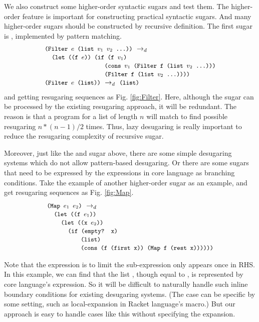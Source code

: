 We also construct some higher-order syntactic sugars and test them. The higher-order feature is important for constructing practical syntactic sugars. And many higher-order sugars should be constructed by recursive definition. The first sugar is , implemented by pattern matching.
\[\begin{array}{l}
\texttt{\small(Filter $e$ (list $v_1$ $v_2$ ...))} ~\rightarrow_d~\\
\quad
\texttt{\small (let ((f $e$)) (if (f $v_1$)}\\
\qquad\qquad\qquad\qquad\;\;\texttt{\small (cons $v_1$ (Filter f (list $v_2$ ...)))}\\
\qquad\qquad\qquad\qquad\;\;\texttt{\small (Filter f (list $v_2$ ...))))}\\

\texttt{\small(Filter $e$ (list))} ~\rightarrow_d~ \texttt{\small(list)}
\end{array}\]
and getting resugaring sequences as Fig.  \ref{fig:Filter}.
Here, although the sugar can be processed by the existing resugaring approach, it will be redundant. The reason is that a  program for a list of length $n$ will match to find possible resugaring $n*(n-1)/2$ times. Thus, lazy desugaring is really important to reduce the resugaring complexity of recursive sugar.

Moreover, just like the  and  sugar above, there are some simple desugaring systems which do not allow pattern-based desugaring. Or there are some sugars that need to be expressed by the expressions in core language as branching conditions. Take the example of another higher-order sugar  as an example, and get resugaring sequences as Fig.  \ref{fig:Map}.
\[
\begin{array}{l}
\texttt{\small(Map $e_1$ $e_2$)} ~\rightarrow_d~\\
\quad\texttt{\small (let ((f $e_1$))}\\
\qquad\texttt{\small(let ((x $e_2$))}\\
\qquad\quad

\texttt{\small(if (empty? x)}\\
\qquad\qquad\;\;\;\texttt{\small(list)}\\
\qquad\qquad\;\;\;\texttt{\small(cons (f (first x)) (Map f (rest x))))))}


\end{array}
\]



Note that the  expression is to limit the sub-expression only appears once in RHS. In this example, we can find that the list , though equal to , is represented by core language's expression. So it will be difficult to naturally handle such inline boundary conditions for existing desugaring systems. (The case can be specific by some setting, such as local-expansion\cite{10.1017/S0956796812000093} in Racket language's macro.) But our approach is easy to handle cases like this without specifying the expansion.


